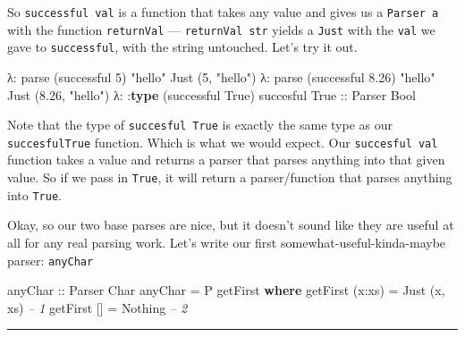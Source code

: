 \documentclass[]{article}
\newenvironment{Shaded}{}{}
\newcommand{\KeywordTok}[1]{\textcolor[rgb]{0.00,0.44,0.13}{\textbf{{#1}}}}
\newcommand{\DataTypeTok}[1]{\textcolor[rgb]{0.56,0.13,0.00}{{#1}}}
\newcommand{\DecValTok}[1]{\textcolor[rgb]{0.25,0.63,0.44}{{#1}}}
\newcommand{\FloatTok}[1]{\textcolor[rgb]{0.25,0.63,0.44}{{#1}}}
\newcommand{\StringTok}[1]{\textcolor[rgb]{0.25,0.44,0.63}{{#1}}}
\newcommand{\CommentTok}[1]{\textcolor[rgb]{0.38,0.63,0.69}{\textit{{#1}}}}
\newcommand{\OtherTok}[1]{\textcolor[rgb]{0.00,0.44,0.13}{{#1}}}
\newcommand{\FunctionTok}[1]{\textcolor[rgb]{0.02,0.16,0.49}{{#1}}}
\newcommand{\NormalTok}[1]{{#1}}
\begin{document}
So \texttt{successful\ val} is a function that takes any value and gives us a
\texttt{Parser\ a} with the function \texttt{returnVal} ---
\texttt{returnVal\ str} yields a \texttt{Just} with the \texttt{val} we gave to
\texttt{successful}, with the string untouched. Let's try it out.

\begin{Shaded}
\begin{Highlighting}[]
\NormalTok{λ}\FunctionTok{:} \NormalTok{parse (successful }\DecValTok{5}\NormalTok{) }\StringTok{"hello"}
\DataTypeTok{Just} \NormalTok{(}\DecValTok{5}\NormalTok{, }\StringTok{"hello"}\NormalTok{)}
\NormalTok{λ}\FunctionTok{:} \NormalTok{parse (successful }\FloatTok{8.26}\NormalTok{) }\StringTok{"hello"}
\DataTypeTok{Just} \NormalTok{(}\FloatTok{8.26}\NormalTok{, }\StringTok{"hello"}\NormalTok{)}
\NormalTok{λ}\FunctionTok{:} \FunctionTok{:}\KeywordTok{type} \NormalTok{(successful }\DataTypeTok{True}\NormalTok{)}
\NormalTok{succesful }\DataTypeTok{True}\OtherTok{ ::} \DataTypeTok{Parser} \DataTypeTok{Bool}
\end{Highlighting}
\end{Shaded}

Note that the type of \texttt{succesful\ True} is exactly the same type as our
\texttt{succesfulTrue} function. Which is what we would expect. Our
\texttt{succesful\ val} function takes a value and returns a parser that parses
anything into that given value. So if we pass in \texttt{True}, it will return a
parser/function that parses anything into \texttt{True}.

Okay, so our two base parses are nice, but it doesn't sound like they are useful
at all for any real parsing work. Let's write our first
somewhat-useful-kinda-maybe parser: \texttt{anyChar}

\begin{Shaded}
\begin{Highlighting}[]
\OtherTok{anyChar ::} \DataTypeTok{Parser} \DataTypeTok{Char}
\NormalTok{anyChar }\FunctionTok{=} \DataTypeTok{P} \NormalTok{getFirst}
    \KeywordTok{where}
        \NormalTok{getFirst (x}\FunctionTok{:}\NormalTok{xs) }\FunctionTok{=} \DataTypeTok{Just} \NormalTok{(x, xs)          }\CommentTok{-- 1}
        \NormalTok{getFirst []     }\FunctionTok{=} \DataTypeTok{Nothing}               \CommentTok{-- 2}
\end{Highlighting}
\end{Shaded}

\begin{center}\rule{0.5\linewidth}{\linethickness}\end{center}
\end{document}
